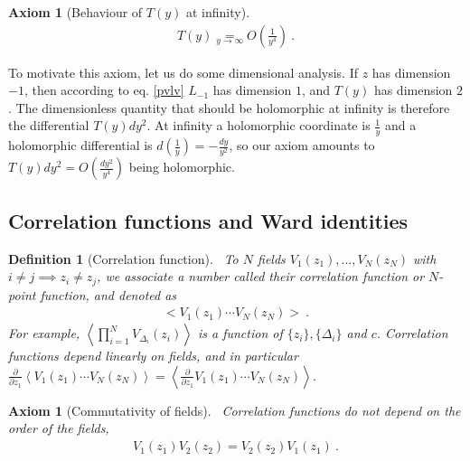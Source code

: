 \documentclass[12pt, a4paper]{article}
\theoremstyle{break}
\newtheorem{hyp}[exo]{Axiom}
\newtheorem{defn}[exo]{Definition}
\begin{document}
\begin{hyp}[Behaviour of $T(y)$ at infinity]
~\label{hyp:ti}
 \begin{align}
 T(y) \underset{y\to\infty} = O\left(\frac{1}{y^4}\right)\ .
 \label{eq:tinf}
\end{align}
\end{hyp}
To motivate this axiom, let us do some dimensional analysis. If $z$ has dimension $-1$, then according to eq. \eqref{pvlv} $L_{-1}$ has dimension $1$, and $T(y)$ has dimension $2$. The dimensionless quantity that should be holomorphic at infinity is therefore the differential $T(y)dy^2$. At infinity a holomorphic coordinate is $\frac{1}{y}$ and a holomorphic differential is $d(\frac{1}{y}) = -\frac{dy}{y^2}$, so our axiom amounts to $T(y)dy^2= O(\frac{dy^2}{y^4})$ being holomorphic.


\subsection{Correlation functions and Ward identities}

\begin{defn}[Correlation function]
~\label{def:cor}
 To $N$ fields $V_1(z_1), \dots ,V_N(z_N)$ with $i\neq j\implies z_i\neq z_j$, we associate a number called their correlation function or $N$-point function, and denoted as 
 \begin{align}
  \Big< V_1(z_1) \cdots V_N(z_N) \Big>\ .
 \end{align}
For example, $\left< \prod_{i=1}^N V_{\Delta_i}(z_i) \right>$ is a function of $\{z_i\}, \{\Delta_i\}$ and $c$.
Correlation functions depend linearly on fields, and in particular $\frac{\partial}{\partial z_1} \left< V_1(z_1) \cdots V_N(z_N) \right> = \left< \frac{\partial}{\partial z_1}V_1(z_1) \cdots V_N(z_N) \right>$.
\end{defn}

\begin{hyp}[Commutativity of fields]
 ~\label{hyp:ass}
 Correlation functions do not depend on the order of the fields,
 \begin{align}
  V_1(z_1) V_2(z_2) = V_2(z_2)V_1(z_1)\ .
 \end{align}
\end{hyp}
\end{document}

